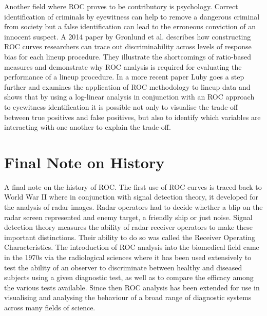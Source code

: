 Another field where ROC proves to be contributory is psychology. Correct identification of criminals by eyewitness can help to remove a dangerous criminal from society but a false identification can lead to the erroneous conviction of an innocent suspect. A 2014 paper by Gronlund et al. \citep{gronlund2014eyewitness} describes how constructing ROC curves researchers can trace out discriminability across levels of response bias for each lineup procedure. They illustrate the shortcomings of ratio-based measures and demonstrate why ROC analysis is required for evaluating the performance of a lineup procedure. In a more recent paper Luby \citep{luby2017lineup} goes a step further and examines the application of ROC methodology to lineup data and shows that by using a log-linear analysis in conjunction with an ROC approach to eyewitness identification it is possible not only to visualise the trade-off between true positives and false positives, but also to identify which variables are interacting with one another to explain the trade-off.

\section{Final Note on History}
A final note on the history of ROC. The first use of ROC curves is traced back to World War II where in conjunction with signal detection theory, it developed for the analysis of radar images. Radar operators had to decide whether a blip on the radar screen represented and enemy target, a friendly ship or just noise. Signal detection theory measures the ability of radar receiver operators to make these important distinctions. Their ability to do so was called the Receiver Operating Characteristics. The introduction of ROC analysis into the biomedical field came in the 1970s via the radiological sciences where it has been used extensively to test the ability of an observer to discriminate between healthy and diseased subjects using a given diagnostic test, as well as to compare the efficacy among the various tests available. Since then ROC analysis has been extended for use in visualising and analysing the behaviour of a broad range of diagnostic systems across many fields of science. 

